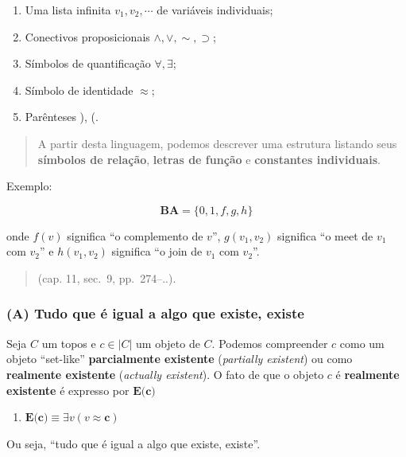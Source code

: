 \begin{enumerate}
\def\labelenumi{\arabic{enumi}.}
\tightlist
\item
  Uma lista infinita \(v_1,v_2, \cdots\) de variáveis individuais;
\item
  Conectivos proposicionais \(\land, \lor, \sim, \supset\);
\item
  Símbolos de quantificação \(\forall, \exists\);
\item
  Símbolo de identidade \(\approx\);
\item
  Parênteses ), (.
\end{enumerate}

\begin{quote}
A partir desta linguagem, podemos descrever uma estrutura listando seus
\textbf{símbolos de relação}, \textbf{letras de função} e
\textbf{constantes individuais}.
\end{quote}

Exemplo:

\[
 \textbf{BA} = \{ 0,1,f,g,h \}
\]

onde \(f(v)\) significa ``o complemento de \(v\)'', \(g(v_1,v_2)\)
significa ``o meet de \(v_1\) com \(v_2\)'' e \(h(v_1,v_2)\) significa
``o join de \(v_1\) com \(v_2\)''.

\begin{quote}
(cap. 11, sec.~9, pp.~274--..).
\end{quote}

\hypertarget{a-tudo-que-uxe9-igual-a-algo-que-existe-existe}{%
\subsubsection{(A) Tudo que é igual a algo que existe,
existe}\label{a-tudo-que-uxe9-igual-a-algo-que-existe-existe}}

Seja \(C\) um topos e \(c \in |C|\) um objeto de \(C\). Podemos
compreender \(c\) como um objeto ``set-like'' \textbf{parcialmente
existente} (\emph{partially existent}) ou como \textbf{realmente
existente} (\emph{actually existent}). O fato de que o objeto \(c\) é
\textbf{realmente existente} é expresso por \(\textbf{E(c)}\)

\begin{enumerate}
\def\labelenumi{\arabic{enumi}.}
\tightlist
\item
  \(\textbf{E(c)} \equiv \exists v (v\approx \textbf{c})\)
\end{enumerate}

Ou seja, ``tudo que é igual a algo que existe, existe''.


